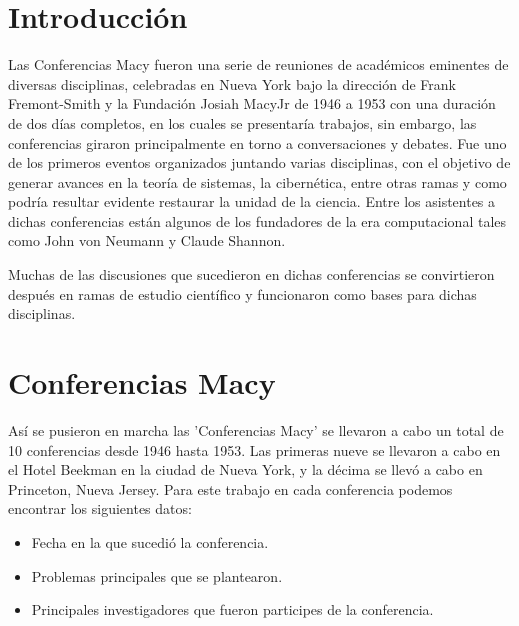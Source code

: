 \documentclass[11pt]{article}
\begin{document}
	\titlepage
	\tableofcontents
	\newpage
	
	\section{Introducción}
		Las Conferencias Macy fueron una serie de reuniones de académicos eminentes de diversas disciplinas, celebradas en Nueva York bajo la dirección de Frank Fremont-Smith y la Fundación Josiah MacyJr de 1946 a 1953 con una duración de dos días completos, en los cuales se presentaría trabajos, sin embargo, las conferencias giraron principalmente en torno a conversaciones y debates. Fue uno de los primeros eventos organizados juntando varias disciplinas, con el objetivo de generar avances en la teoría de sistemas, la cibernética, entre otras ramas y como podría resultar evidente restaurar la unidad de la ciencia. Entre los asistentes a dichas conferencias están algunos de los fundadores de la era computacional tales como John von Neumann y Claude Shannon.\par
Muchas de las discusiones que sucedieron en dichas conferencias se convirtieron después en ramas de estudio científico y funcionaron como bases para dichas disciplinas. 
	
	\section{Conferencias Macy}
		Así se pusieron en marcha las 'Conferencias Macy' se llevaron a cabo un total de 10 conferencias desde 1946 hasta 1953. Las primeras nueve se llevaron a cabo en el Hotel Beekman en la ciudad de Nueva York, y la décima se llevó a cabo en Princeton, Nueva Jersey. Para este trabajo en cada conferencia podemos encontrar los siguientes datos:
		 \begin{itemize}
    		\item Fecha en la que sucedió la conferencia.
		 	 \item Problemas principales que se plantearon.
		  	\item Principales investigadores que fueron participes de la conferencia.
		\end{itemize}\par
\end{document}
